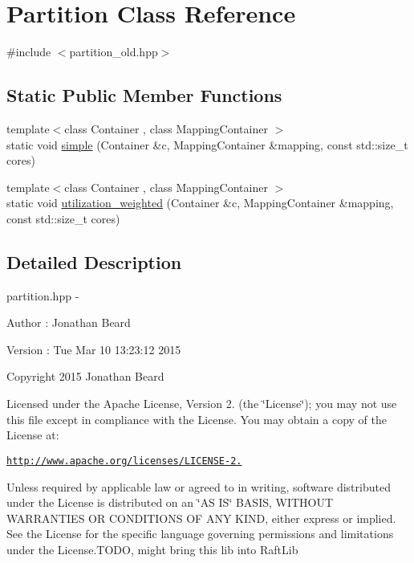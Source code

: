 \hypertarget{class_partition}{}\section{Partition Class Reference}
\label{class_partition}


{\ttfamily \#include $<$partition\+\_\+old.\+hpp$>$}

\subsection*{Static Public Member Functions}
\begin{DoxyCompactItemize}
\item 
{\footnotesize template$<$class Container , class Mapping\+Container $>$ }\\static void \hyperlink{class_partition_a60481d98fd1958b78250241e6e2a011f}{simple} (Container \&c, Mapping\+Container \&mapping, const std\+::size\+\_\+t cores)
\item 
{\footnotesize template$<$class Container , class Mapping\+Container $>$ }\\static void \hyperlink{class_partition_aeb39bcc732a88f06288b38e1b1c29978}{utilization\+\_\+weighted} (Container \&c, Mapping\+Container \&mapping, const std\+::size\+\_\+t cores)
\end{DoxyCompactItemize}


\subsection{Detailed Description}
partition.\+hpp -\/ \begin{DoxyAuthor}{Author}
\+: Jonathan Beard 
\end{DoxyAuthor}
\begin{DoxyVersion}{Version}
\+: Tue Mar 10 13\+:23\+:12 2015
\end{DoxyVersion}
Copyright 2015 Jonathan Beard

Licensed under the Apache License, Version 2. (the \char`\"{}\+License\char`\"{}); you may not use this file except in compliance with the License. You may obtain a copy of the License at\+:

\href{http://www.apache.org/licenses/LICENSE-2.0}{\tt http\+://www.\+apache.\+org/licenses/\+L\+I\+C\+E\+N\+S\+E-\/2.}

Unless required by applicable law or agreed to in writing, software distributed under the License is distributed on an \char`\"{}\+A\+S I\+S\char`\"{} B\+A\+S\+I\+S, W\+I\+T\+H\+O\+U\+T W\+A\+R\+R\+A\+N\+T\+I\+E\+S O\+R C\+O\+N\+D\+I\+T\+I\+O\+N\+S O\+F A\+N\+Y K\+I\+N\+D, either express or implied. See the License for the specific language governing permissions and limitations under the License.\+T\+O\+D\+O, might bring this lib into Raft\+Lib 

